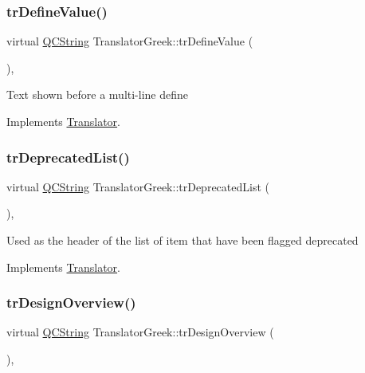 \subsubsection{\texorpdfstring{trDefineValue()}{trDefineValue()}}
{\footnotesize\ttfamily virtual \mbox{\hyperlink{class_q_c_string}{Q\+C\+String}} Translator\+Greek\+::tr\+Define\+Value (\begin{DoxyParamCaption}{ }\end{DoxyParamCaption})\hspace{0.3cm}{\ttfamily [inline]}, {\ttfamily [virtual]}}

Text shown before a multi-\/line define 

Implements \mbox{\hyperlink{class_translator}{Translator}}.

\mbox{\label{class_translator_greek_afe33ff0d5a6a6ac3cc62d8f55f64a137}} 
\subsubsection{\texorpdfstring{trDeprecatedList()}{trDeprecatedList()}}
{\footnotesize\ttfamily virtual \mbox{\hyperlink{class_q_c_string}{Q\+C\+String}} Translator\+Greek\+::tr\+Deprecated\+List (\begin{DoxyParamCaption}{ }\end{DoxyParamCaption})\hspace{0.3cm}{\ttfamily [inline]}, {\ttfamily [virtual]}}

Used as the header of the list of item that have been flagged deprecated 

Implements \mbox{\hyperlink{class_translator}{Translator}}.

\mbox{\label{class_translator_greek_a7d617841f3141e56f0f6a9b89110705b}} 
\subsubsection{\texorpdfstring{trDesignOverview()}{trDesignOverview()}}
{\footnotesize\ttfamily virtual \mbox{\hyperlink{class_q_c_string}{Q\+C\+String}} Translator\+Greek\+::tr\+Design\+Overview (\begin{DoxyParamCaption}{ }\end{DoxyParamCaption})\hspace{0.3cm}{\ttfamily [inline]}, {\ttfamily [virtual]}}

